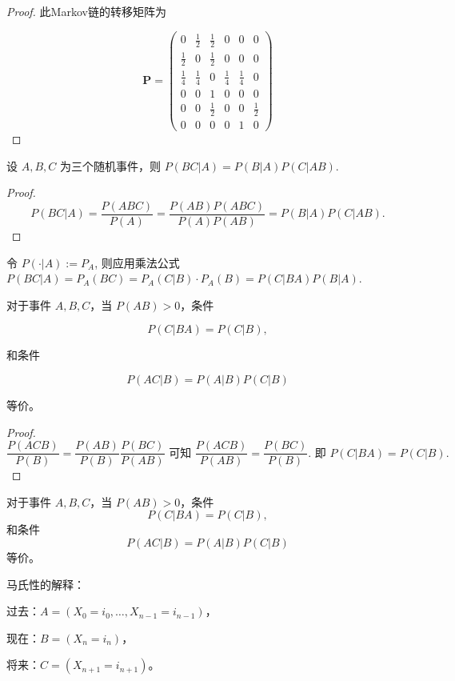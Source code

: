 \documentclass[lang=cn,10pt,thmcnt=section]{elegantbook}
\begin{document}
\begin{proof}
	此Markov链的转移矩阵为

\[
\mathbf{P} = \begin{pmatrix}
0 & \frac{1}{2} & \frac{1}{2} & 0 & 0 & 0 \\
\frac{1}{2} & 0 & \frac{1}{2} & 0 & 0 & 0 \\
\frac{1}{4} & \frac{1}{4} & 0 & \frac{1}{4} & \frac{1}{4} & 0 \\
0 & 0 & 1 & 0 & 0 & 0 \\
0 & 0 & \frac{1}{2} & 0 & 0 & \frac{1}{2} \\
0 & 0 & 0 & 0 & 1 & 0
\end{pmatrix}
\]
\end{proof}

\begin{theorem}
	设 $A, B, C$ 为三个随机事件，则 $P(BC|A) = P(B|A)P(C|AB)$.
\end{theorem}
\begin{proof}
	\[
P(BC|A) = \frac{P(ABC)}{P(A)} = \frac{P(AB)P(ABC)}{P(A)P(AB)} = P(B|A)P(C|AB).
\]
\end{proof}
\begin{remark}
	令 $P(\cdot|A) := P_A$, 则应用乘法公式 $P(BC|A) = P_A(BC) = P_A(C|B) \cdot P_A(B) = P(C|BA)P(B|A)$.

\end{remark}
\begin{theorem}
	对于事件 $A, B, C$，当 $P(AB) > 0$，条件

\[
P(C|BA) = P(C|B),
\]

和条件

\[
P(AC|B) = P(A|B)P(C|B)
\]

等价。
\end{theorem}
\begin{proof}
	\[
\frac{P(ACB)}{P(B)} = \frac{P(AB)}{P(B)} \frac{P(BC)}{P(AB)} \text{ 可知 } \frac{P(ACB)}{P(AB)} = \frac{P(BC)}{P(B)}. \text{ 即 } P(C|BA) = P(C|B).
\]
\end{proof}
\begin{theorem}
	对于事件 $A, B, C$，当 $P(AB) > 0$，条件
\[ P(C|BA) = P(C|B), \]
和条件
\[ P(AC|B) = P(A|B)P(C|B) \]
等价。


\end{theorem}
马氏性的解释：

过去：$A = (X_0 = i_0, \ldots, X_{n-1} = i_{n-1})$，

现在：$B = (X_n = i_n)$，

将来：$C = (X_{n+1} = i_{n+1})$。
\end{document}
